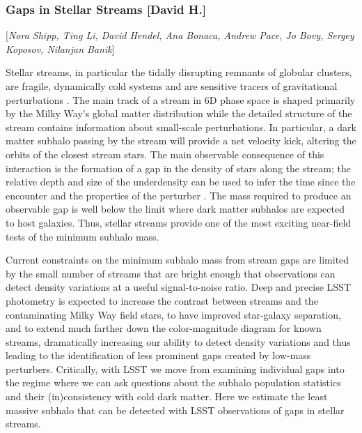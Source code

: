 \documentclass[modern,linenumbers]{aastex62}
\newcommand{\Contributors}[1]{ {\footnotesize [\textit{#1}]}}
\newcommand{\Contact}[1]{ {\footnotesize [\textbf{#1}]}}
\begin{document}
\subsubsection{Gaps in Stellar Streams \Contact{David H.}}
\Contributors{Nora Shipp, Ting Li, David Hendel, Ana Bonaca, Andrew Pace, Jo Bovy, Sergey Koposov, Nilanjan Banik}
\label{sec:stream_gaps}


Stellar streams, in particular the tidally disrupting remnants of globular clusters, are fragile, dynamically cold systems and are sensitive tracers of gravitational perturbations \citep[][]{Carlberg:2012}.
The main track of a stream in 6D phase space is shaped primarily by the Milky Way's global matter distribution while the detailed structure of the stream contains information about small-scale perturbations. 
In particular, a dark matter subhalo passing by the stream will provide a net velocity kick, altering the orbits of the closest stream stars.
The main observable consequence of this interaction is the formation of a gap in the density of stars along the stream; the relative depth and size of the underdensity can be used to infer the time since the encounter and the properties of the perturber \citep{Carlberg:2012, Erkal:2015}. The mass required to produce an observable gap \citep[$10^5-10^6 M_\odot$,][]{erkal2016,bovy:2017} is well below the limit where dark matter subhalos are expected to host galaxies. Thus, stellar streams provide one of the most exciting near-field tests of the minimum subhalo mass.

Current constraints on the minimum subhalo mass from stream gaps are limited by the small number of streams that are bright enough that observations can detect density variations at a useful signal-to-noise ratio. Deep and precise LSST photometry is expected to increase the contrast between streams and the contaminating Milky Way field stars, to have improved star-galaxy separation, and to extend much farther down the color-magnitude diagram for known streams, dramatically increasing our ability to detect density variations and thus leading to the identification of less prominent gaps created by low-mass perturbers. Critically, with LSST we move from examining individual gaps into the regime where we can ask questions about the subhalo population statistics and their (in)consistency with cold dark matter.
Here we estimate the least massive subhalo that can be detected with LSST observations of gaps in stellar streams.
\end{document}
